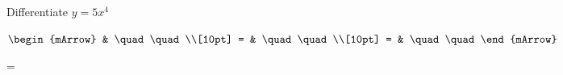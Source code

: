\begin{mtask}
\begin{exercise}
\begin{envSolution}
\begin{mArrow}
				 = & \quad \quad 
              \end{mArrow}$
            \begin{shortsolution}  
			     =$ \quad \quad \quad \quad$
			\end{shortsolution}				 
           \end{envSolution}
         \end{exercise}
	\task \begin{exercise} Differentiate $y=5x^4$
           \begin{envSolution}
             $\begin{mArrow}
                   & \quad \quad              \\[10pt]
		   		 = & \quad \quad              \\[10pt]
				 = & \quad \quad 
              \end{mArrow}$
            \begin{shortsolution}  
			     =$ \quad \quad \quad \quad$
			\end{shortsolution}				 
           \end{envSolution}
         \end{exercise}
\end{mtask}
\clearpage
{}
